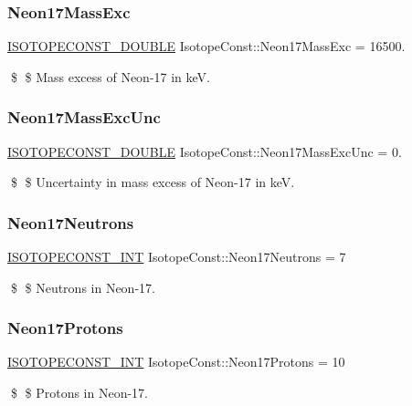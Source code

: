 \subsubsection{\texorpdfstring{Neon17\+Mass\+Exc}{Neon17MassExc}}
{\footnotesize\ttfamily \mbox{\hyperlink{group___isotope_const-_macros_ga8f45a7272ce02c0b4c65c44636ed719a}{I\+S\+O\+T\+O\+P\+E\+C\+O\+N\+S\+T\+\_\+\+D\+O\+U\+B\+LE}} Isotope\+Const\+::\+Neon17\+Mass\+Exc = 16500.}

\$ \$ Mass excess of Neon-\/17 in keV. \mbox{\label{group___isotope_const-_neon-_ne17_gaea971274962b3f98c1feb75551c5f6ce}} 
\subsubsection{\texorpdfstring{Neon17\+Mass\+Exc\+Unc}{Neon17MassExcUnc}}
{\footnotesize\ttfamily \mbox{\hyperlink{group___isotope_const-_macros_ga8f45a7272ce02c0b4c65c44636ed719a}{I\+S\+O\+T\+O\+P\+E\+C\+O\+N\+S\+T\+\_\+\+D\+O\+U\+B\+LE}} Isotope\+Const\+::\+Neon17\+Mass\+Exc\+Unc = 0.}

\$ \$ Uncertainty in mass excess of Neon-\/17 in keV. \mbox{\label{group___isotope_const-_neon-_ne17_ga7a40b2acabda78b61cf6494d6c07664d}} 
\subsubsection{\texorpdfstring{Neon17\+Neutrons}{Neon17Neutrons}}
{\footnotesize\ttfamily \mbox{\hyperlink{group___isotope_const-_macros_ga5f18360b3e99483a35c32d789e62621c}{I\+S\+O\+T\+O\+P\+E\+C\+O\+N\+S\+T\+\_\+\+I\+NT}} Isotope\+Const\+::\+Neon17\+Neutrons = 7}

\$ \$ Neutrons in Neon-\/17. \mbox{\label{group___isotope_const-_neon-_ne17_gaf0ab244dd446fef94c24f959dca7a4ea}} 
\subsubsection{\texorpdfstring{Neon17\+Protons}{Neon17Protons}}
{\footnotesize\ttfamily \mbox{\hyperlink{group___isotope_const-_macros_ga5f18360b3e99483a35c32d789e62621c}{I\+S\+O\+T\+O\+P\+E\+C\+O\+N\+S\+T\+\_\+\+I\+NT}} Isotope\+Const\+::\+Neon17\+Protons = 10}

\$ \$ Protons in Neon-\/17. 
